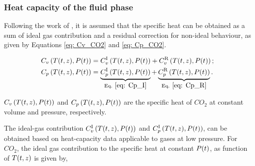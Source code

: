 \documentclass[../Article_Model_Parameters.tex]{subfiles}
\begin{document}
	\subsubsection{Heat capacity of the fluid phase} \label{subsubsec: Fluid heat capacity}
	
	Following the work of \citet{Pratt2001}, it is assumed that the specific heat can be obtained as a sum of ideal gas contribution and a residual correction for non-ideal behaviour, as given by Equations \ref{eq: Cv_CO2} and \ref{eq: Cp_CO2}.
	
	{\footnotesize
		\begin{subequations}\begin{align}
				{\color{black}C_v}\left({\color{black}T}(t,z), {\color{black}P}(t)\right) & = {\color{black}C_v^{\text{I}}}\left({\color{black}T}(t,z),P(t)\right) + {\color{black}C_v^{\text{R}}}\left({\color{black}T}(t,z), {\color{black}P}(t)\right) \label{eq: Cv_CO2}; \\ 
				{\color{black}C_p}\left({\color{black}T}(t,z), {\color{black}P}(t)\right) & = \underbrace{{\color{black}C_p^{\text{I}}}\left({\color{black}T}(t,z),P(t)\right)}_{\text{Eq. } \eqref{eq: Cp_I}} + \underbrace{{\color{black}C_p^{\text{R}}}\left({\color{black}T}(t,z), {\color{black}P}(t)\right)}_{\text{Eq. } \eqref{eq: Cp_R}}  \label{eq: Cp_CO2}.
	\end{align}\end{subequations} }
	
	${\color{black}C_v}\left({\color{black}T}(t,z), {\color{black}P}(t)\right)$ and ${\color{black}C_p}\left({\color{black}T}(t,z), {\color{black}P}(t)\right)$ are the specific heat of $CO_2$ at constant volume and pressure, respectively. 
	
	The ideal-gas contribution ${\color{black}C_v^{\text{I}}}\left({\color{black}T}(t,z), {\color{black}P}(t)\right)$ and ${\color{black}C_p^{\text{I}}}\left({\color{black}T}(t,z), {\color{black}P}(t)\right)$, can be obtained based on heat-capacity data applicable to gases at low pressure. For $CO_2$, the ideal gas contribution to the specific heat at constant ${\color{black}P}(t)$, as function of ${\color{black}T}(t,z)$ is given by,
	
\end{document}
